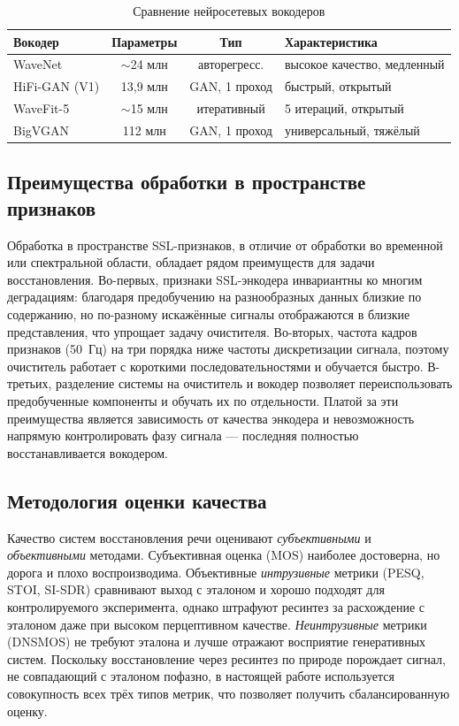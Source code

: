 \begin{table}[H]
    \caption{Сравнение нейросетевых вокодеров}
    \label{tab:vocoders}
    \centering
    \footnotesize
    \begin{tabularx}{\textwidth}{l c c X}
        \toprule
        Вокодер & Параметры & Тип & Характеристика \\
        \midrule
        WaveNet & $\sim$24 млн & авторегресс. & высокое качество, медленный \\
        HiFi-GAN (V1) & 13,9 млн & GAN, 1 проход & быстрый, открытый \\
        WaveFit-5 & $\sim$15 млн & итеративный & 5 итераций, открытый \\
        BigVGAN & 112 млн & GAN, 1 проход & универсальный, тяжёлый \\
        \bottomrule
    \end{tabularx}
\end{table}

\subsection{Преимущества обработки в пространстве признаков}

Обработка в пространстве SSL-признаков, в отличие от обработки во временной или
спектральной области, обладает рядом преимуществ для задачи восстановления.
Во-первых, признаки SSL-энкодера инвариантны ко многим деградациям: благодаря
предобучению на разнообразных данных близкие по содержанию, но по-разному
искажённые сигналы отображаются в близкие представления, что упрощает задачу
очистителя. Во-вторых, частота кадров признаков (50~Гц) на три порядка ниже
частоты дискретизации сигнала, поэтому очиститель работает с короткими
последовательностями и обучается быстро. В-третьих, разделение системы на
очиститель и вокодер позволяет переиспользовать предобученные компоненты и
обучать их по отдельности. Платой за эти преимущества является зависимость от
качества энкодера и невозможность напрямую контролировать фазу сигнала ---
последняя полностью восстанавливается вокодером.

\subsection{Методология оценки качества}

Качество систем восстановления речи оценивают \emph{субъективными} и
\emph{объективными} методами. Субъективная оценка (MOS) наиболее достоверна, но
дорога и плохо воспроизводима. Объективные \emph{интрузивные} метрики (PESQ,
STOI, SI-SDR) сравнивают выход с эталоном и хорошо подходят для контролируемого
эксперимента, однако штрафуют ресинтез за расхождение с эталоном даже при
высоком перцептивном качестве. \emph{Неинтрузивные} метрики (DNSMOS) не требуют
эталона и лучше отражают восприятие генеративных систем. Поскольку
восстановление через ресинтез по природе порождает сигнал, не совпадающий с
эталоном пофазно, в настоящей работе используется совокупность всех трёх типов
метрик, что позволяет получить сбалансированную оценку.

